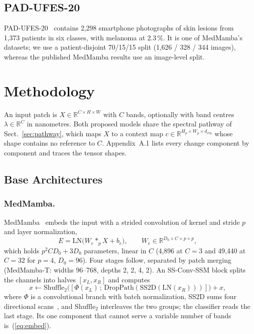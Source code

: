 \documentclass{svproc}
\begin{document}
\subsection{PAD-UFES-20}
PAD-UFES-20~\cite{pad_desc,pad_data} contains 2,298 smartphone photographs of skin lesions from 1,373 patients in six classes, with melanoma at 2.3\,\%. It is one of MedMamba's datasets; we use a patient-disjoint 70/15/15 split (1,626 / 328 / 344 images), whereas the published MedMamba results use an image-level split.

\section{Methodology}
An input patch is $X \in \mathbb{R}^{C \times H \times W}$ with $C$ bands, optionally with band centres $\lambda \in \mathbb{R}^{C}$ in nanometres. Both proposed models share the spectral pathway of Sect.~\ref{sec:pathway}, which maps $X$ to a context map $c \in \mathbb{R}^{H_p \times W_p \times d_{\text{ctx}}}$ whose shape contains no reference to $C$. Appendix~A.1 lists every change component by component and traces the tensor shapes.

\subsection{Base Architectures}
\subsubsection{MedMamba.}
MedMamba~\cite{medmamba} embeds the input with a strided convolution of kernel and stride $p$ and layer normalization,
\begin{equation}
E = \mathrm{LN}\big(W_e \ast_p X + b_e\big), \qquad W_e \in \mathbb{R}^{D_0 \times C \times p \times p},
\label{eq:embed}
\end{equation}
which holds $p^2 C D_0 + 3 D_0$ parameters, linear in $C$ (4,896 at $C=3$ and 49,440 at $C=32$ for $p=4$, $D_0=96$). Four stages follow, separated by patch merging (MedMamba-T: widths 96--768, depths 2, 2, 4, 2). An SS-Conv-SSM block splits the channels into halves $[x_L, x_R]$ and computes
\begin{equation}
x \leftarrow \mathrm{Shuffle}_2\big([\Phi(x_L) \,;\, \mathrm{DropPath}(\mathrm{SS2D}(\mathrm{LN}(x_R)))]\big) + x,
\label{eq:ssconv}
\end{equation}
where $\Phi$ is a convolutional branch with batch normalization, SS2D sums four directional scans~\cite{vmamba}, and $\mathrm{Shuffle}_2$ interleaves the two groups; the classifier reads the last stage. Its one component that cannot serve a variable number of bands is~(\ref{eq:embed}).
\end{document}

